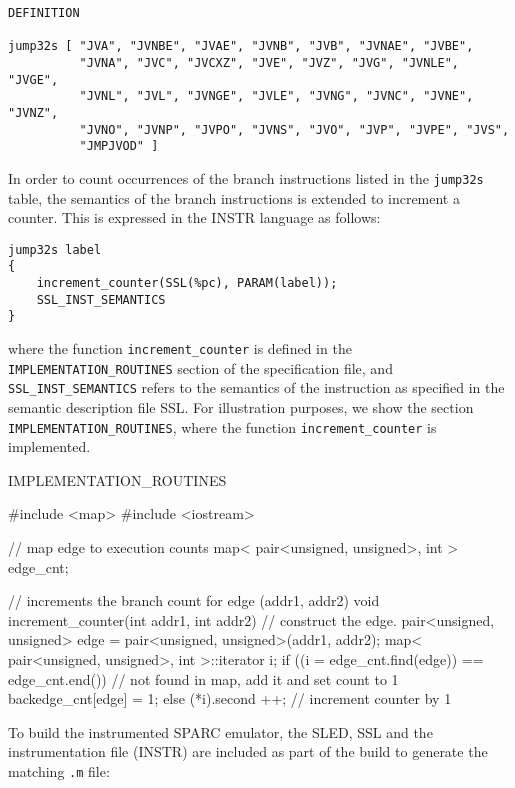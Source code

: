 \begin{verbatim}
DEFINITION

jump32s	[ "JVA", "JVNBE", "JVAE", "JVNB", "JVB", "JVNAE", "JVBE",
          "JVNA", "JVC", "JVCXZ", "JVE", "JVZ", "JVG", "JVNLE", "JVGE",
          "JVNL", "JVL", "JVNGE", "JVLE", "JVNG", "JVNC", "JVNE", "JVNZ",
          "JVNO", "JVNP", "JVPO", "JVNS", "JVO", "JVP", "JVPE", "JVS", 
          "JMPJVOD" ]
\end{verbatim}

In order to count occurrences of the branch instructions listed
in the \texttt{jump32s} table, the semantics of the branch instructions is 
extended to increment a counter.  This is expressed in the INSTR language
as follows: 

\begin{verbatim}
jump32s label
{
    increment_counter(SSL(%pc), PARAM(label));
    SSL_INST_SEMANTICS
}
\end{verbatim}

where the function \texttt{increment\_counter} is defined in the 
\texttt{IMPLEMENTATION\_ROUTINES} section of the specification file, 
and \texttt{SSL\_INST\_SEMANTICS} refers to the semantics of the instruction 
as specified in the semantic description file SSL.  
For illustration purposes, we show the section 
\texttt{IMPLEMENTATION\_ROUTINES}, where the function 
\texttt{increment\_counter} is implemented. 
  
\begin{smallverbatim}
IMPLEMENTATION_ROUTINES

#include <map>
#include <iostream>

// map edge to execution counts
map< pair<unsigned, unsigned>, int > edge_cnt;

// increments the branch count for edge (addr1, addr2)
void increment_counter(int addr1, int addr2) {
    // construct the edge.
    pair<unsigned, unsigned> edge = 
            pair<unsigned, unsigned>(addr1, addr2);
    map< pair<unsigned, unsigned>, int >::iterator i;
    if ((i = edge_cnt.find(edge)) == edge_cnt.end()) 
    {
        // not found in map, add it and set count to 1
        backedge_cnt[edge] = 1;
    } else 
    {
        (*i).second ++;      // increment counter by 1
    }
}
\end{smallverbatim}


To build the instrumented SPARC emulator, the SLED, SSL and the 
instrumentation file (INSTR) are included as part of the build to generate 
the matching \texttt{.m} file:

